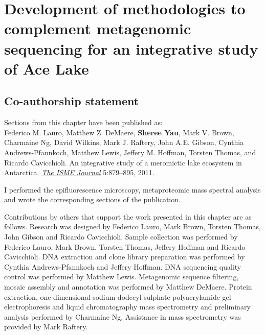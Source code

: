 \chapter[Development of methodologies to complement metagenomic sequencing for an integrative study of Ace Lake]{Development of methodologies to complement metagenomic sequencing for an integrative study of  Ace Lake}
\label{ch:ace}
\acresetall

\section*{Co-authorship statement}

Sections from this chapter have been published as:\\

Federico M. Lauro, Matthew Z. DeMaere, \textbf{Sheree Yau}, Mark V. Brown, Charmaine Ng,
David Wilkins, Mark J. Raftery, John A.E. Gibson, Cynthia Andrews-Pfannkoch, Matthew Lewis,
Jeffery M. Hoffman, Torsten Thomas, and Ricardo Cavicchioli. 
An integrative study of a meromictic lake ecosystem in Antarctica. \emph{\underline{The ISME Journal}} 
5:879--895, 2011.

I performed the epifluorescence microscopy, metaproteomic mass spectral analysis and wrote the corresponding sections of the publication.

Contributions by others that support the work presented in this chapter are as follows.
Research was designed by Federico Lauro, Mark Brown, Torsten Thomas, John Gibson and Ricardo Cavicchioli.
Sample collection was performed by Federico Lauro, Mark Brown, Torsten Thomas, Jeffery Hoffman and Ricardo Cavicchioli.
\textsc{DNA} extraction and clone library preparation was performed by Cynthia Andrews-Pfannkoch and Jeffery Hoffman.
\textsc{DNA} sequencing quality control was performed by Matthew Lewis.
Metagenomic sequence filtering, mosaic assembly and annotation was performed by Matthew DeMaere.
Protein extraction, one-dimensional sodium dodecyl sulphate-polyacrylamide gel electrophoresis and liquid chromatography mass spectrometry and preliminary analysis performed by Charmaine Ng.
Assistance in mass spectrometry was provided by Mark Raftery.
\newpage

